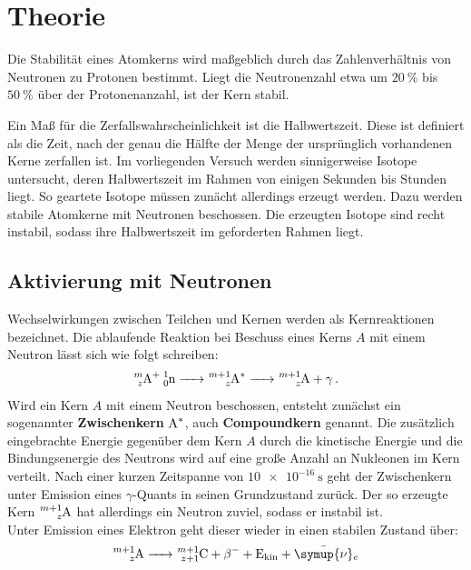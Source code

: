 \section{Theorie}
\label{sec:Theorie}
Die Stabilität eines Atomkerns wird maßgeblich durch das Zahlenverhältnis von Neutronen zu Protonen bestimmt. Liegt die Neutronenzahl etwa um $\SI{20}{\percent}$ bis $\SI{50}{\percent}$ über der Protonenanzahl, ist der Kern stabil.

Ein Maß für die Zerfallswahrscheinlichkeit ist die Halbwertszeit. Diese ist definiert als die Zeit, nach der genau die Hälfte der Menge der ursprünglich vorhandenen Kerne zerfallen ist.
Im vorliegenden Versuch werden sinnigerweise Isotope untersucht, deren Halbwertszeit im Rahmen von einigen Sekunden bis Stunden liegt.
So geartete Isotope müssen zunächt allerdings erzeugt werden. Dazu werden stabile Atomkerne mit Neutronen beschossen. Die erzeugten Isotope sind recht instabil, sodass ihre Halbwertszeit im geforderten Rahmen liegt.


\subsection{Aktivierung mit Neutronen}
Wechselwirkungen zwischen Teilchen und Kernen werden als Kernreaktionen bezeichnet.
Die ablaufende Reaktion bei Beschuss eines Kerns $A$ mit einem Neutron lässt sich wie folgt schreiben:
\begin{align}
	\ce{^{m}_{z}A+ ^{1}_0n -> ^{m+1}_zA^{*} -> ^{m+1}_zA +\gamma} \, \mathrm{.}
\end{align}
Wird ein Kern $A$ mit einem Neutron beschossen, entsteht zunächst ein sogenannter \textbf{Zwischenkern} $\ce{A^{*}}$, auch \textbf{Compoundkern} genannt. Die zusätzlich eingebrachte Energie gegenüber dem Kern $A$ durch die kinetische Energie und die Bindungsenergie des Neutrons wird auf eine große Anzahl an Nukleonen im Kern verteilt.
Nach einer kurzen Zeitspanne von $\SI{10e-16}{\second}$ geht der Zwischenkern unter Emission eines $\gamma$-Quants in seinen Grundzustand zurück.
Der so erzeugte Kern $\ce{^{m+1}_zA }$ hat allerdings ein Neutron zuviel, sodass er instabil ist.\\
Unter Emission eines Elektron geht dieser wieder in einen stabilen Zustand über:
\begin{align*}
\ce{^{m+1}_zA -> ^{m+1}_{z+1}C +\beta ^{-} + E_{\mathrm{kin }} + \bar{\symup{\nu}}_e}
\end{align*}

